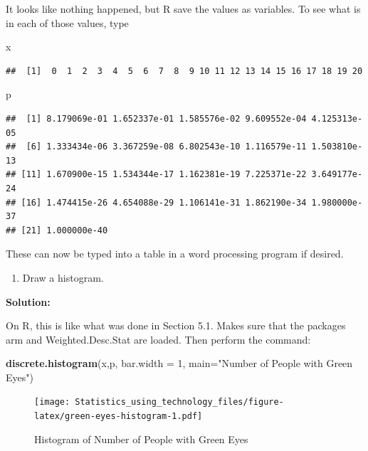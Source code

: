\documentclass[]{book}
\newenvironment{Shaded}{\begin{snugshade}}{\end{snugshade}}
\newcommand{\DataTypeTok}[1]{\textcolor[rgb]{0.13,0.29,0.53}{#1}}
\newcommand{\DecValTok}[1]{\textcolor[rgb]{0.00,0.00,0.81}{#1}}
\newcommand{\KeywordTok}[1]{\textcolor[rgb]{0.13,0.29,0.53}{\textbf{#1}}}
\newcommand{\NormalTok}[1]{#1}
\newcommand{\StringTok}[1]{\textcolor[rgb]{0.31,0.60,0.02}{#1}}
\providecommand{\tightlist}{%
  \setlength{\itemsep}{0pt}\setlength{\parskip}{0pt}}
\begin{document}
It looks like nothing happened, but R save the values as variables. To see what is in each of those values, type

\begin{Shaded}
\begin{Highlighting}[]
\NormalTok{x}
\end{Highlighting}
\end{Shaded}

\begin{verbatim}
##  [1]  0  1  2  3  4  5  6  7  8  9 10 11 12 13 14 15 16 17 18 19 20
\end{verbatim}

\begin{Shaded}
\begin{Highlighting}[]
\NormalTok{p}
\end{Highlighting}
\end{Shaded}

\begin{verbatim}
##  [1] 8.179069e-01 1.652337e-01 1.585576e-02 9.609552e-04 4.125313e-05
##  [6] 1.333434e-06 3.367259e-08 6.802543e-10 1.116579e-11 1.503810e-13
## [11] 1.670900e-15 1.534344e-17 1.162381e-19 7.225371e-22 3.649177e-24
## [16] 1.474415e-26 4.654088e-29 1.106141e-31 1.862190e-34 1.980000e-37
## [21] 1.000000e-40
\end{verbatim}

These can now be typed into a table in a word processing program if desired.

\begin{enumerate}
\def\labelenumi{\alph{enumi}.}
\setcounter{enumi}{2}
\tightlist
\item
  Draw a histogram.
\end{enumerate}

\textbf{Solution:}

On R, this is like what was done in Section 5.1. Makes sure that the packages arm and Weighted.Desc.Stat are loaded. Then perform the command:



\begin{Shaded}
\begin{Highlighting}[]
\KeywordTok{discrete.histogram}\NormalTok{(x,p, }\DataTypeTok{bar.width =} \DecValTok{1}\NormalTok{, }\DataTypeTok{main=}\StringTok{"Number of People with Green Eyes"}\NormalTok{)}
\end{Highlighting}
\end{Shaded}

\begin{figure}
\centering
\texttt{[image: Statistics\_using\_technology\_files/figure-latex/green-eyes-histogram-1.pdf]}
\caption{\label{fig:green-eyes-histogram}Histogram of Number of People with Green Eyes}
\end{figure}
\end{document}

